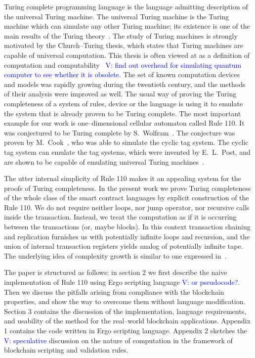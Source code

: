 \documentclass[runningheads]{llncs}
\newcommand{\vk}[1]{\textcolor{blue}{V: {#1}}}
\begin{document}
    Turing complete programming language is the language admitting description
    of the universal Turing machine. The universal Turing machine is the Turing
    machine which can simulate any other Turing machine; its existence is one of
    the main results of the Turing theory~\cite{turing1937computable}. The study
    of Turing machines is strongly motivated by the Church--Turing thesis, which
    states that Turing machines are capable of universal computation. This
    thesis is often viewed at as a definition of computation and
    computability~\cite{turing1939systems} \vk{find out overhead for simulating
    quantum computer to see whether it is obsolete}. The set of known
    computation devices and models was rapidly growing during the twentieth
    century, and the methods of their analysis were improved as well. The
    usual way of proving the Turing completeness of a system of rules, device or
    the language is using it to emulate the system that is already proven to be
    Turing complete. The most important example for our work is one--dimensional
    cellular automaton called Rule 110. It was conjectured to be Turing complete
    by S.~Wolfram~\cite{wolfram1986theory}. The conjecture was proven by
    M.~Cook~\cite{cook2004universality}, who was able to simulate the cyclic tag
    system.  The cyclic tag system can emulate the tag systems, which were
    invented by E.~L.~Post, and are shown to be capable of emulating universal
    Turing machines~\cite{post1943formal}.

    The utter internal simplicity of Rule 110 makes it an appealing system for
    the proofs of Turing completeness. In the present work we prove Turing
    completeness of the whole class of the smart contract languages by explicit
    construction of the Rule 110. We do not require neither loops, nor jump
    operator, nor recursive calls inside the transaction. Instead, we treat the
    computation as if it is occurring between the transactions (or, maybe
    blocks). In this context transaction chaining and replication furnishes us
    with potentially infinite loops and recursion, and the union of internal
    transaction registers yields analog of potentially infinite tape. The
    underlying idea of complexity growth is similar to one expressed
    in~\cite{von1951general}.

    The paper is structured as follows: in section 2 we first describe the naive
    implementation of Rule 110 using Ergo scripting language \vk{or pseudocode?}.
    Then we discuss the pitfalls arising from compliance with the blockchain
    properties, and show the way to overcome them without language modification.
    Section 3 contains the discussion of the implementation, language
    requirements, and usability of the method for the real--world blockchain
    applications.  Appendix 1 contains the code written in Ergo scripting
    language.  Appendix 2 sketches the \vk{speculative} discussion on the nature
    of computation in the framework of blockchain scripting and validation
    rules.
\end{document}
